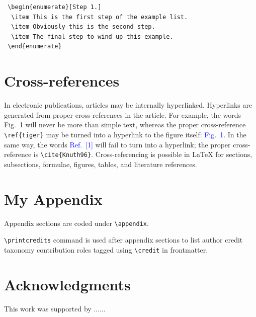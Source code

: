 \documentclass[a4paper,fleqn]{cas-sc}
\begin{document}
\begin{verbatim}
 \begin{enumerate}[Step 1.]
  \item This is the first step of the example list.
  \item Obviously this is the second step.
  \item The final step to wind up this example.
 \end{enumerate}
\end{verbatim}

\section{Cross-references}
In electronic publications, articles may be internally
hyperlinked. Hyperlinks are generated from proper
cross-references in the article.  For example, the words
\textcolor{black!80}{Fig.~1} will never be more than simple text,
whereas the proper cross-reference \verb+\ref{tiger}+ may be
turned into a hyperlink to the figure itself:
\textcolor{blue}{Fig.~1}.  In the same way,
the words \textcolor{blue}{Ref.~[1]} will fail to turn into a
hyperlink; the proper cross-reference is \verb+\cite{Knuth96}+.
Cross-referencing is possible in \LaTeX{} for sections,
subsections, formulae, figures, tables, and literature
references.







\appendix
\section{My Appendix}
Appendix sections are coded under \verb+\appendix+.

\verb+\printcredits+ command is used after appendix sections to list 
author credit taxonomy contribution roles tagged using \verb+\credit+ 
in frontmatter.


\printcredits


\section*{Acknowledgments}

This work was supported by ......

%
%



\end{document}
